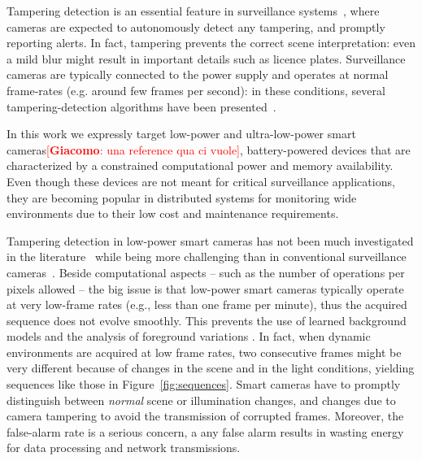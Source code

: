 \documentclass{llncs}
\newcommand{\gi}[1]{{\textcolor{red}{[\small \textbf{Giacomo}: #1]}}}
\begin{document}
Tampering detection is an essential feature in surveillance systems~\cite{hampapur2005smart}, where cameras are expected to autonomously detect any tampering, and promptly reporting alerts. In fact, tampering prevents the correct scene interpretation: even a mild blur might result in important details such as licence plates. Surveillance cameras are typically connected to the power supply and operates at normal frame-rates (e.g. around few frames per second): in these conditions, several tampering-detection algorithms have been presented~\cite{TODO}.  

In this work we expressly target low-power and ultra-low-power smart cameras\gi{una reference qua ci vuole}, battery-powered devices that are characterized by a constrained computational power and memory availability. Even though these devices are not meant for critical surveillance applications, they are becoming popular in distributed systems for monitoring wide environments due to their low cost and maintenance requirements.  %

Tampering detection in low-power smart cameras has not been much investigated in the literature~\cite{alippi2010detecting} while being more challenging than in conventional surveillance cameras~\cite{perrig2004security}. Beside computational aspects -- such as the number of operations per pixels allowed -- the big issue is that low-power smart cameras typically operate at very low-frame rates (e.g., less than one frame per minute), thus the acquired sequence does not evolve smoothly. This prevents the use of learned background models and the analysis of foreground variations \cite{piccardi2004background}. In fact, when dynamic environments are acquired at low frame rates, two consecutive frames might be very different because of changes in the scene and in the light conditions, yielding sequences like those in Figure~\ref{fig:sequences}. Smart cameras have to promptly distinguish between \emph{normal} scene or illumination changes, and changes due to camera tampering to avoid the transmission of corrupted frames. Moreover, the false-alarm rate is a serious concern, a any false alarm results in wasting energy for data processing and network transmissions.
\end{document}
